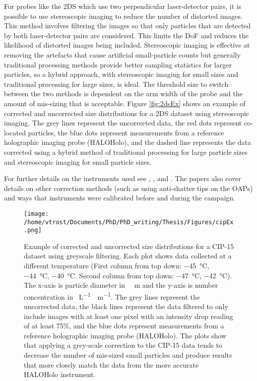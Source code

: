 For probes like the 2DS which use two perpendicular laser-detector pairs, it is possible to use stereoscopic imaging to reduce the number of distorted images. This method involves filtering the images so that only particles that are detected by both laser-detector pairs are considered. This limits the DoF and reduces the likelihood of distorted images being included. Stereoscopic imaging is effective at removing the artefacts that cause artificial small-particle counts but generally traditional processing methods provide better sampling statistics for larger particles, so a hybrid approach, with stereoscopic imaging for small sizes and traditional processing for large sizes, is ideal. The threshold size to switch between the two methods is dependent on the arm width of the probe and the amount of mis-sizing that is acceptable. Figure \ref{fig:2dsEx} shows an example of corrected and uncorrected size distributions for a 2DS dataset using stereoscopic imaging. The grey lines represent the uncorrected data, the red dots represent co-located particles, the blue dots represent measurements from a reference holographic imaging probe (HALOHolo), and the dashed line represents the data corrected using a hybrid method of traditional processing for large particle sizes and stereoscopic imaging for small particle sizes. \citep{oshea2021}

For further details on the instruments used see \cite{king2008}, \cite{craw2017}, and \cite{oshea2017}. The papers also cover details on other correction methods (such as using anti-shatter tips on the OAPs) and ways that instruments were calibrated before and during the campaign.

\begin{figure}[H]
	\centering
	\texttt{[image: /home/vtrost/Documents/PhD/PhD\_writing/Thesis/Figures/cipEx.png]}
	\caption{Example of corrected and uncorrected size distributions for a CIP-15 dataset using greyscale filtering. Each plot shows data collected at a different temperature (First column from top down: \SI{-45}{\degreeCelsius}, \SI{-44}{\degreeCelsius}, \SI{-40}{\degreeCelsius}. Second column from top down: \SI{-47}{\degreeCelsius}, \SI{-42}{\degreeCelsius}). The x-axis is particle diameter in \SI{}{\mu m} and the y-axis is number concentration in \SI{}{L^{-1} \mu m^{-1}}. The grey lines represent the uncorrected data, the black lines represent the data filtered to only include images with at least one pixel with an intensity drop reading of at least 75\%, and the blue dots represent measurements from a reference holographic imaging probe (HALOHolo). The plots show that applying a grey-scale correction to the CIP-15 data tends to decrease the number of mis-sized small particles and produce results that more closely match the data from the more accurate HALOHolo instrument. \citep[][Figure 13]{oshea2021}}
	\label{fig:cipEx}
\end{figure}

